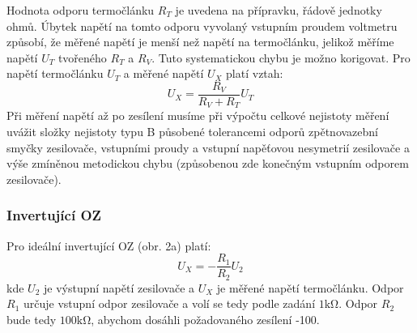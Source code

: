 \documentclass{article}
\begin{document}
Hodnota odporu termočlánku $R_T$ je uvedena na přípravku, řádově jednotky ohmů. Úbytek napětí na tomto odporu vyvolaný vstupním proudem voltmetru způsobí, že měřené napětí je menší než napětí na termočlánku, jelikož měříme napětí $U_T$ tvořeného $R_T$ a $R_V$. Tuto systematickou chybu je možno korigovat. Pro napětí termočlánku $U_T$ a měřené napětí $U_X$ platí vztah:
\begin{equation}
    U_X = \frac{R_V}{R_V+R_T}U_T
\end{equation}
Při měření napětí až po zesílení musíme při výpočtu celkové nejistoty měření uvážit složky nejistoty typu B působené tolerancemi odporů zpětnovazební smyčky zesilovače, vstupními proudy a vstupní napěťovou nesymetrií zesilovače a výše zmíněnou metodickou chybu (způsobenou zde konečným vstupním odporem zesilovače).

\subsubsection{Invertující OZ}
Pro ideální invertující OZ (obr. 2a) platí:
\begin{equation}
    U_X=-\frac{R_1}{R_2}U_2
\end{equation}
kde $U_2$ je výstupní napětí zesilovače a $U_X$ je měřené napětí termočlánku. Odpor $R_1$ určuje vstupní odpor zesilovače a volí se tedy podle zadání $1 \si{\kilo\ohm}$. Odpor $R_2$ bude tedy $100 \si{\kilo\ohm}$, abychom dosáhli požadovaného zesílení -100.
\end{document}
